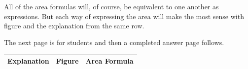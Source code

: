 \documentclass{ximera}
\begin{document}
\begin{problem}
All of the area formulas will, of course, be equivalent to one another as expressions.  But each way of expressing the area will make the most sense with figure and the explanation from the same row.  

\begin{teachingnote}
The next page is for students and then a completed answer page follows.
\end{teachingnote}



\newpage

\newlength{\formulawidth}

{\renewcommand{\arraystretch}{1.5}
\begin{tabular}{|>{\centering\arraybackslash}m{2.5cm}|>{\centering\arraybackslash}m{9.5cm}|c|}\hline
Explanation & Figure & Area Formula \\\hline


\end{tabular}}
\end{problem}
\end{document}
